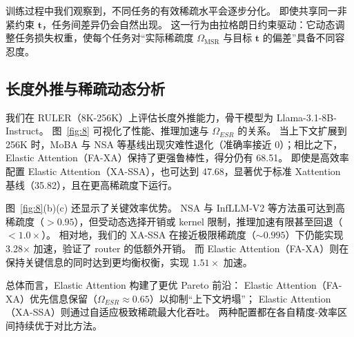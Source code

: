 训练过程中我们观察到，不同任务的有效稀疏水平会逐步分化。
即使共享同一非紧约束 $\boldsymbol{t}$，任务间差异仍会自然出现。
这一行为由拉格朗日约束驱动：它动态调整任务损失权重，使每个任务对“实际稀疏度 $\Omega_{\mathrm{MSR}}$ 与目标 $\boldsymbol{t}$ 的偏差”具备不同容忍度。


\subsection{长度外推与稀疏动态分析}
\label{appdix:length_extrapolation_and_sparsity_dynamics_analysis}
我们在 RULER（8K-256K）上评估长度外推能力，骨干模型为 Llama-3.1-8B-Instruct。
图~\ref{fig:8} 可视化了性能、推理加速与 $\Omega_{ESR}$ 的关系。
当上下文扩展到 256K 时，MoBA 与 NSA 等基线出现灾难性退化（准确率接近 0）；相比之下，Elastic Attention（FA-XA）保持了更强鲁棒性，得分仍有 68.51。
即使是高效率配置 Elastic Attention（XA-SSA），也可达到 47.68，显著优于标准 Xattention 基线（35.82），且在更高稀疏度下运行。

图~\ref{fig:8}(b)(c) 还显示了关键效率优势。
NSA 与 InfLLM-V2 等方法虽可达到高稀疏度（$>0.95$），但受动态选择开销或 kernel 限制，推理加速有限甚至回退（$<1.0\times$）。
相对地，我们的 XA-SSA 在接近极限稀疏度（$\sim 0.995$）下仍能实现 3.28$\times$ 加速，验证了 router 的低额外开销。
而 Elastic Attention（FA-XA）则在保持关键信息的同时达到更均衡权衡，实现 $1.51\times$ 加速。

总体而言，Elastic Attention 构建了更优 Pareto 前沿：
Elastic Attention（FA-XA）优先信息保留（$\Omega_{ESR} \approx 0.65$）以抑制“上下文坍塌”；
Elastic Attention（XA-SSA）则通过自适应极致稀疏最大化吞吐。
两种配置都在各自精度-效率区间持续优于对比方法。

